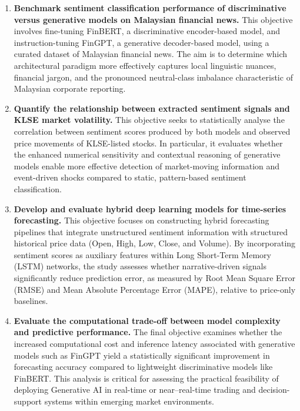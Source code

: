 \documentclass[singlespace]{ucetd}
\begin{document}
\begin{enumerate}
    \item \textbf{Benchmark sentiment classification performance of discriminative versus generative models on Malaysian financial news.}  
    This objective involves fine-tuning FinBERT, a discriminative encoder-based model, and instruction-tuning FinGPT, a generative decoder-based model, using a curated dataset of Malaysian financial news. The aim is to determine which architectural paradigm more effectively captures local linguistic nuances, financial jargon, and the pronounced neutral-class imbalance characteristic of Malaysian corporate reporting.

    \item \textbf{Quantify the relationship between extracted sentiment signals and KLSE market volatility.}  
    This objective seeks to statistically analyse the correlation between sentiment scores produced by both models and observed price movements of KLSE-listed stocks. In particular, it evaluates whether the enhanced numerical sensitivity and contextual reasoning of generative models enable more effective detection of market-moving information and event-driven shocks compared to static, pattern-based sentiment classification.

    \item \textbf{Develop and evaluate hybrid deep learning models for time-series forecasting.}  
    This objective focuses on constructing hybrid forecasting pipelines that integrate unstructured sentiment information with structured historical price data (Open, High, Low, Close, and Volume). By incorporating sentiment scores as auxiliary features within Long Short-Term Memory (LSTM) networks, the study assesses whether narrative-driven signals significantly reduce prediction error, as measured by Root Mean Square Error (RMSE) and Mean Absolute Percentage Error (MAPE), relative to price-only baselines.

    \item \textbf{Evaluate the computational trade-off between model complexity and predictive performance.}  
    The final objective examines whether the increased computational cost and inference latency associated with generative models such as FinGPT yield a statistically significant improvement in forecasting accuracy compared to lightweight discriminative models like FinBERT. This analysis is critical for assessing the practical feasibility of deploying Generative AI in real-time or near–real-time trading and decision-support systems within emerging market environments.
\end{enumerate}
\end{document}
